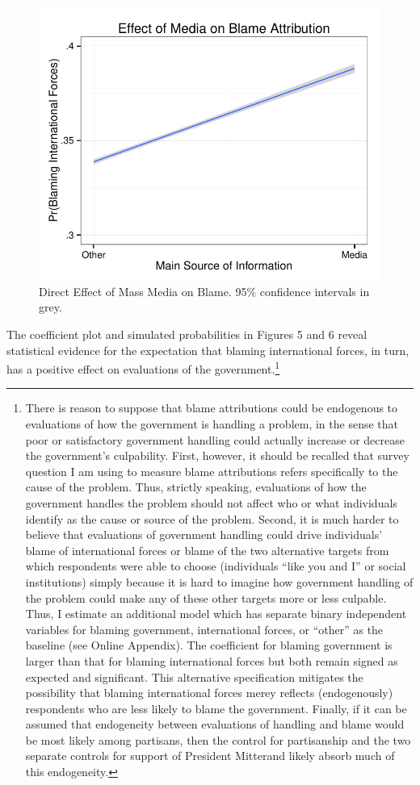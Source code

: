 \documentclass[12pt]{report}
\begin{document}
\begin{center}
\begin{figure}
\includegraphics{article1_media_blame_effect}
\caption{Direct Effect of Mass Media on Blame. 95\% confidence intervals in grey.}
\end{figure}
\end{center}

The coefficient plot and simulated probabilities in Figures 5 and 6 reveal statistical evidence for
the expectation that blaming international forces, in turn, has a positive effect on evaluations of
the government.\footnote{There is reason to suppose that blame attributions could be endogenous to
evaluations of how the government is handling a problem, in the sense that poor or satisfactory
government handling could actually increase or decrease the government's culpability. First,
however, it should be recalled that survey question I am using to measure blame attributions refers
specifically to the cause of the problem. Thus, strictly speaking, evaluations of how the government
handles the problem should not affect who or what individuals identify as the cause or source of the
problem. Second, it is much harder to believe that evaluations of government handling could drive
individuals' blame of international forces or blame of the two alternative targets from which
respondents were able to choose (individuals ``like you and I'' or social institutions) simply
because it is hard to imagine how government handling of the problem could make any of these other
targets more or less culpable. Thus, I estimate an additional model which has separate binary
independent variables for blaming government, international forces, or ``other'' as the baseline
(see Online Appendix). The coefficient for blaming government is larger than that for blaming
international forces but both remain signed as expected and significant. This alternative
specification mitigates the possibility that blaming international forces merey reflects
(endogenously) respondents who are less likely to blame the government. Finally, if it can be
assumed that endogeneity between evaluations of handling and blame would be most likely among
partisans, then the control for partisanship and the two separate controls for support of President
Mitterand likely absorb much of this endogeneity.}
\end{document}
